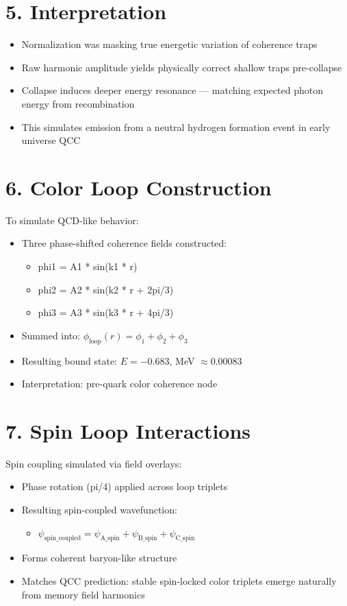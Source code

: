 \documentclass[12pt]{article}
\begin{document}
\section*{5. Interpretation}
\begin{itemize}
  \item Normalization was masking true energetic variation of coherence traps
  \item Raw harmonic amplitude yields physically correct shallow traps pre-collapse
  \item Collapse induces deeper energy resonance — matching expected photon energy from recombination
  \item This simulates emission from a neutral hydrogen formation event in early universe QCC
\end{itemize}

\section*{6. Color Loop Construction}
To simulate QCD-like behavior:
\begin{itemize}
  \item Three phase-shifted coherence fields constructed:
    \begin{itemize}
      \item phi1 = A1 * sin(k1 * r)
      \item phi2 = A2 * sin(k2 * r + 2pi/3)
      \item phi3 = A3 * sin(k3 * r + 4pi/3)
    \end{itemize}
	\item Summed into: $\phi_{\text{loop}}(r) = \phi_1 + \phi_2 + \phi_3$
	\item Resulting bound state: $E = -0.683$, MeV $\approx 0.00083$
	\item Interpretation: pre-quark color coherence node

\end{itemize}

\section*{7. Spin Loop Interactions}
Spin coupling simulated via field overlays:
\begin{itemize}
  \item Phase rotation (pi/4) applied across loop triplets
  \item Resulting spin-coupled wavefunction:
	\begin{itemize}
		\item $\psi_{\text{spin\_coupled}} = \psi_{\text{A\_spin}} + \psi_{\text{B\_spin}} + \psi_{\text{C\_spin}}$
	\end{itemize}
  \item Forms coherent baryon-like structure
  \item Matches QCC prediction: stable spin-locked color triplets emerge naturally from memory field harmonics
\end{itemize}
\end{document}
